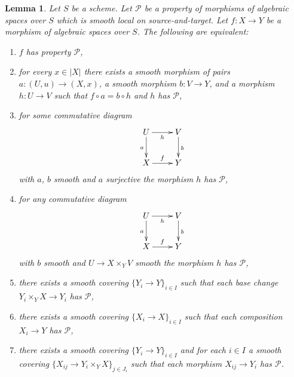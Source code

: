 \documentclass[10pt,a4paper]{amsart}
\theoremstyle{plain}
\newtheorem{lemma}[subsection]{Lemma}
\theoremstyle{definition}
\theoremstyle{remark}
\numberwithin{equation}{subsection}
\begin{document}
\begin{lemma}
\label{lemma-local-source-target-characterize}
Let $S$ be a scheme.
Let $\mathcal{P}$ be a property of morphisms of algebraic spaces over $S$
which is smooth local on source-and-target. Let $f : X \to Y$ be a morphism
of algebraic spaces over $S$. The following are equivalent:
\begin{enumerate}
\item[(a)] $f$ has property $\mathcal{P}$,
\item[(b)] for every $x \in |X|$ there exists a smooth morphism of pairs
$a : (U, u) \to (X, x)$, a smooth morphism $b : V \to Y$, and
a morphism $h : U \to V$ such that $f \circ a = b \circ h$ and
$h$ has $\mathcal{P}$,
\item[(c)] for some commutative diagram
$$
\xymatrix{
U \ar[d]_a \ar[r]_h & V \ar[d]^b \\
X \ar[r]^f & Y
}
$$
with $a$, $b$ smooth and $a$ surjective the morphism $h$ has $\mathcal{P}$,
\item[(d)] for any commutative diagram
$$
\xymatrix{
U \ar[d]_a \ar[r]_h & V \ar[d]^b \\
X \ar[r]^f & Y
}
$$
with $b$ smooth and $U \to X \times_Y V$ smooth
the morphism $h$ has $\mathcal{P}$,
\item[(e)] there exists a smooth covering $\{Y_i \to Y\}_{i \in I}$ such
that each base change $Y_i \times_Y X \to Y_i$ has $\mathcal{P}$,
\item[(f)] there exists a smooth covering $\{X_i \to X\}_{i \in I}$ such
that each composition $X_i \to Y$ has $\mathcal{P}$,
\item[(g)] there exists a smooth covering $\{Y_i \to Y\}_{i \in I}$ and
for each $i \in I$ a smooth covering
$\{X_{ij} \to Y_i \times_Y X\}_{j \in J_i}$ such that each morphism
$X_{ij} \to Y_i$ has $\mathcal{P}$.
\end{enumerate}
\end{lemma}
\end{document}
